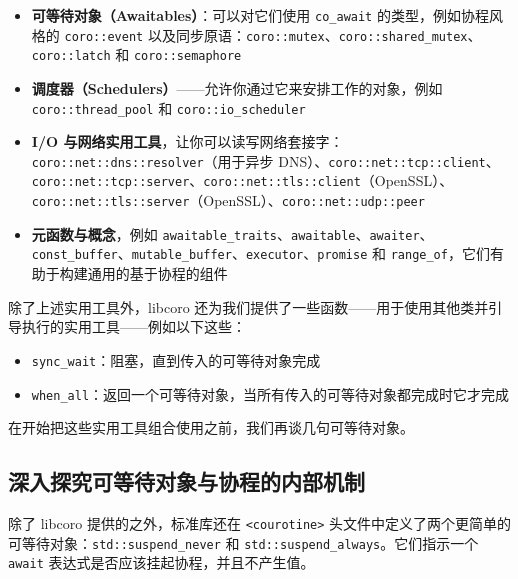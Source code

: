 \begin{itemize}
\item \textbf{可等待对象（Awaitables）}：可以对它们使用 \texttt{co\_await} 的类型，例如协程风格的 \texttt{coro::\allowbreak{}event} 以及同步原语：\texttt{coro::\allowbreak{}mutex}、\texttt{coro::\allowbreak{}shared\_\allowbreak{}mutex}、\texttt{coro::\allowbreak{}latch} 和 \texttt{coro::\allowbreak{}semaphore}
\item \textbf{调度器（Schedulers）}——允许你通过它来安排工作的对象，例如 \texttt{coro::\allowbreak{}thread\_\allowbreak{}pool} 和 \texttt{coro::\allowbreak{}io\_\allowbreak{}scheduler}
\item \textbf{I/O 与网络实用工具}，让你可以读写网络套接字：\texttt{coro::\allowbreak{}net::\allowbreak{}dns::\allowbreak{}resolver}（用于异步 DNS）、\texttt{coro::\allowbreak{}net::\allowbreak{}tcp::\allowbreak{}client}、\texttt{coro::\allowbreak{}net::\allowbreak{}tcp::\allowbreak{}server}、\texttt{coro::\allowbreak{}net::\allowbreak{}tls::\allowbreak{}client}（OpenSSL）、\texttt{coro::\allowbreak{}net::\allowbreak{}tls::\allowbreak{}server}（OpenSSL）、\texttt{coro::\allowbreak{}net::\allowbreak{}udp::\allowbreak{}peer}
\label{idx:1267}
\item \textbf{元函数与概念}，例如 \texttt{awaitable\_\allowbreak{}traits}、\texttt{awaitable}、\texttt{awaiter}、\texttt{const\_\allowbreak{}buffer}、\texttt{mutable\_\allowbreak{}buffer}、\texttt{executor}、\texttt{promise} 和 \texttt{range\_of}，它们有助于构建通用的基于协程的组件
\end{itemize}

除了上述实用工具外，libcoro 还为我们提供了一些函数——用于使用其他类并引导执行的实用工具——例如以下这些：

\begin{itemize}
\item \texttt{sync\_\allowbreak{}wait}：阻塞，直到传入的可等待对象完成
\item \texttt{when\_all}：返回一个可等待对象，当所有传入的可等待对象都完成时它才完成
\end{itemize}

在开始把这些实用工具组合使用之前，我们再谈几句可等待对象。

\subsection{深入探究可等待对象与协程的内部机制}

\label{idx:1268}
除了 libcoro 提供的之外，标准库还在 \texttt{<courotine>} 头文件中定义了两个更简单的可等待对象：\texttt{std::\allowbreak{}suspend\_\allowbreak{}never} 和 \texttt{std::\allowbreak{}suspend\_\allowbreak{}always}。它们指示一个 \texttt{await} 表达式是否应该挂起协程，并且不产生值。

